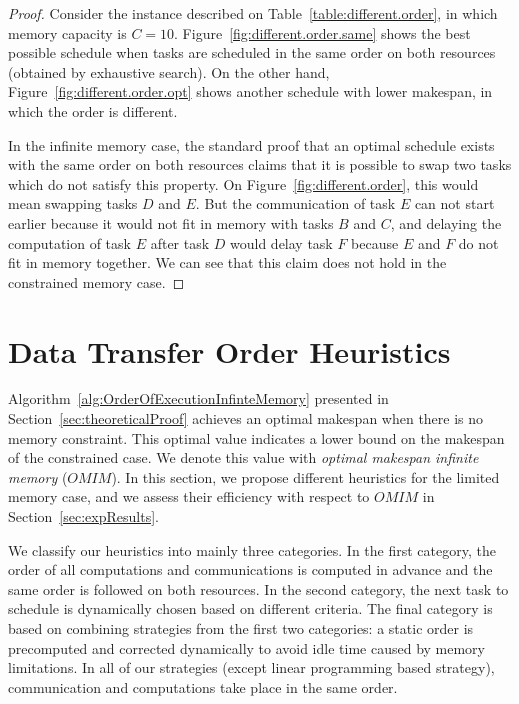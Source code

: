 \documentclass[sigconf]{acmart}
\begin{document}
	\begin{proof}
		Consider the instance described on
		Table~\ref{table:different.order}, in which memory capacity
		is $C=10$. Figure~\ref{fig:different.order.same} shows the
		best possible schedule when tasks are scheduled in the same
		order on both resources (obtained by exhaustive search). On
		the other hand, Figure~\ref{fig:different.order.opt} shows
		another schedule with lower makespan, in which the order is
		different.
		
		In the infinite memory case, the standard proof that an
		optimal schedule exists with the same order on both
		resources claims that it is possible to swap two tasks which
		do not satisfy this property. On
		Figure~\ref{fig:different.order}, this would mean swapping
		tasks $D$ and $E$. But the communication of task $E$ can not
		start earlier because it would not fit in memory with tasks
		$B$ and $C$, and delaying the computation of task $E$ after
		task $D$ would delay task $F$ because $E$ and $F$ do not fit
		in memory together. We can see that this claim does not hold
		in the constrained memory case. 
	\end{proof}
	
	
	
	\section{Data Transfer Order Heuristics}
	\label{sec:heuristics}
	
	Algorithm~\ref{alg:OrderOfExecutionInfinteMemory} presented in Section~\ref{sec:theoreticalProof} achieves an optimal makespan when there is no memory constraint. This optimal value indicates a lower bound on the makespan of the constrained case. We denote this value with \textit{optimal makespan infinite memory} ($OMIM$). In this section, we propose different heuristics for the limited memory case, and we assess their efficiency with respect to $OMIM$ in Section~\ref{sec:expResults}.
	
	
	We classify our heuristics into mainly three categories. In the first category, the order of all computations and communications is computed in advance and the same order is followed on both resources. In the second category, the next task to schedule is dynamically chosen based on different criteria. The final category is based on combining strategies from the first two categories: a static order is precomputed and corrected dynamically to avoid idle time caused by memory limitations. In all of our strategies (except linear programming based strategy), communication and computations take place in the same order.
	
\end{document}
